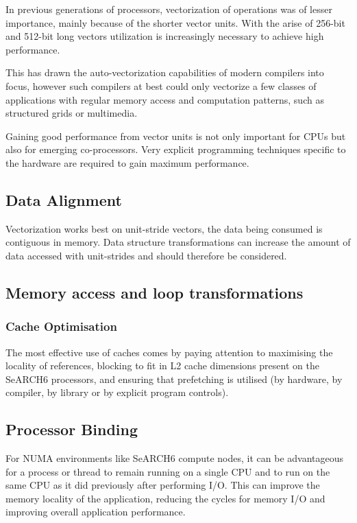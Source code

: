 \documentclass[
  oneside,
  11pt, a4paper,
  footinclude=true,
  headinclude=true,
  cleardoublepage=empty
]{scrbook}
\begin{document}
In previous generations of processors, vectorization of operations was of lesser importance, mainly because of the shorter vector units. With the arise of 256-bit and 512-bit long vectors utilization is increasingly necessary to achieve high performance.\par 

This has drawn the auto-vectorization capabilities of modern compilers into focus, however such compilers at best could only vectorize a few classes of applications with regular memory access and computation patterns, such as structured grids or multimedia.\par 

Gaining good performance from vector units is not only important for CPUs but also for emerging co-processors. 
Very explicit programming techniques specific to the hardware are required to gain maximum performance.

\subsection{Data Alignment}

    Vectorization works best on unit-stride vectors, the data being consumed is contiguous in memory. 
    Data structure transformations can increase the amount of data accessed with unit-strides and should therefore be considered.
    
\subsection{Memory access and loop transformations}

\subsubsection{Cache Optimisation}

The most effective use of caches comes by paying attention to maximising the locality of references, blocking to fit in L2 cache dimensions present on the SeARCH6 processors, and ensuring that prefetching is utilised (by hardware, by compiler, by library or by explicit program controls).


\subsection{Processor Binding}
For NUMA environments like SeARCH6 compute nodes, it can be advantageous for a process or thread to remain
running on a single CPU and to run on the same CPU as it did previously after
performing I/O. This can improve the memory locality of the application, reducing
the cycles for memory I/O and improving overall application performance.
\end{document}
